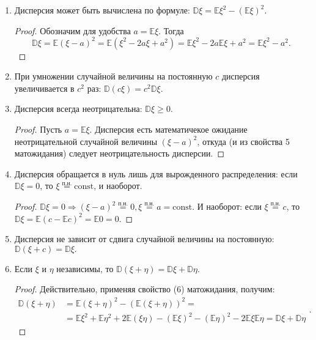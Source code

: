 \begin{enumerate}

    \item Дисперсия может быть вычислена по формуле: $\mathbb{D}\xi = \mathbb{E}\xi^2 - (\mathbb{E}\xi)^2$.
    
    \begin{proof}
        Обозначим для удобства $a = \mathbb{E}\xi.$ Тогда
    $$\mathbb{D} \xi=\mathbb{E}(\xi-a)^{2}=\mathbb{E}\left(\xi^{2}-2 a \xi+a^{2}\right)=\mathbb{E} \xi^{2}-2 a \mathbb{E} \xi+a^{2}=\mathbb{E} \xi^{2}-a^{2}.$$
    \end{proof} 
    
    \item При умножении случайной величины на постоянную $c$ дисперсия увеличивается в $c^2$ раз: $\mathbb{D}(c\xi) = c^2\mathbb{D}\xi.$
    \item Дисперсия всегда неотрицательна: $\mathbb{D}\xi \geqslant 0.$
    
    \begin{proof}
        Пусть $a = \mathbb{E}\xi.$ Дисперсия есть математичекое ожидание неотрицательной случайной величины $(\xi - a)^2$, откуда (и из свойства 5 матожидания) следует неотрицательность дисперсии.
    \end{proof}
    
    \item Дисперсия обращается в нуль лишь для вырожденного распределения: если $\mathbb{D}\xi = 0$, то $\xi \overset{\text{п.н.}}{=} \text{const}$, и наоборот.
    
    \begin{proof}
        $\mathbb{D}\xi = 0 \Rightarrow (\xi - a)^2 \overset{\text{п.н.}}{=} 0, \xi \overset{\text{п.н.}}{=} a =\text{const}$. И наоборот: если $\xi \overset{\text{п.н.}}{=} c$, то $\mathbb{D} \xi=\mathbb{E}(c-\mathbb{E} c)^{2}=\mathbb{E} 0=0.$
    \end{proof} 
    
    \item Дисперсия не зависит от сдвига случайной величины на постоянную: $\mathbb{D}(\xi + c) = \mathbb{D}\xi.$
    
    \item Если $\xi$ и $\eta$ независимы, то $\mathbb{D}(\xi + \eta) = \mathbb{D}\xi + \mathbb{D}\eta.$
    
    \begin{proof}
    Действительно, применяя свойство (6) матожидания, получим:
    $$\begin{aligned}
    \mathbb{D}(\xi+\eta) &=\mathbb{E}(\xi+\eta)^{2}-(\mathbb{E}(\xi+\eta))^{2}=\\
    &=\mathbb{E} \xi^{2}+\mathbb{E} \eta^{2}+2 \mathbb{E}(\xi \eta)-(\mathbb{E} \xi)^{2}-(\mathbb{E} \eta)^{2}-2 \mathbb{E} \xi \mathbb{E} \eta=\mathbb{D} \xi+\mathbb{D} \eta
    \end{aligned}.$$
    \end{proof}
    

\end{enumerate}
